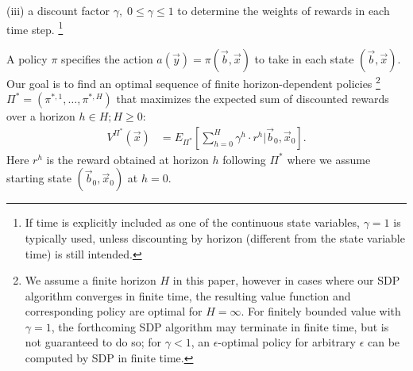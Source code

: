 \documentclass[twoside,11pt]{article}
\begin{document}
(iii) a discount factor $\gamma, \; 0 \leq \gamma \leq 1$ to determine the weights of rewards in each time step.
\footnote{If time is explicitly included as one of the
continuous state variables, $\gamma = 1$ is typically used, unless
discounting by horizon (different from the state variable time) is
still intended.}  

A policy $\pi$ specifies the action $a(\vec{y}) =\pi(\vec{b},\vec{x})$ to take in each state $(\vec{b},\vec{x})$.  Our
goal is to find an optimal sequence of finite horizon-dependent
policies
\footnote{We assume a finite horizon $H$ in this
paper, however in cases where our SDP algorithm converges
in finite time, the resulting value function and 
corresponding policy are optimal for $H=\infty$. 
For finitely bounded value
with $\gamma = 1$, the forthcoming SDP algorithm may terminate in
finite time, but is not guaranteed to do so; for $\gamma < 1$, an
$\epsilon$-optimal policy for arbitrary $\epsilon$ can be computed by
SDP in finite time.
} 
$\Pi^* = (\pi^{*,1},\ldots,\pi^{*,H})$ that
maximizes the expected sum of discounted rewards over a horizon $h \in H; H \geq 0$:
\begin{align}
V^{\Pi^*}(\vec{x}) & = E_{\Pi^*} \left[ \sum_{h=0}^{H} \gamma^h \cdot r^h \Big| \vec{b}_0,\vec{x}_0 \right]. \label{eq:vfun_def}
\end{align}
Here $r^h$ is the reward obtained at horizon $h$ following $\Pi^*$ where 
we assume starting state $(\vec{b}_0,\vec{x}_0)$ at $h=0$.
\end{document}
